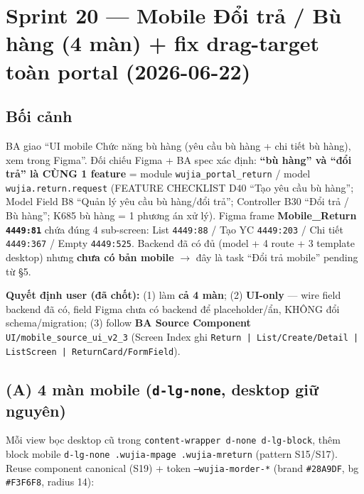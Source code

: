 \chapter{Sprint 20 --- Mobile Đổi trả / Bù hàng (4 màn) + fix drag-target toàn portal (2026-06-22)}

\section{Bối cảnh}

BA giao ``UI mobile Chức năng bù hàng (yêu cầu bù hàng + chi tiết bù hàng), xem trong
Figma''. Đối chiếu Figma + BA spec xác định: \textbf{``bù hàng'' và ``đổi trả'' là CÙNG
1 feature} = module \texttt{wujia\_portal\_return} / model \texttt{wujia.return.request}
(FEATURE CHECKLIST D40 ``Tạo yêu cầu bù hàng''; Model Field B8 ``Quản lý yêu cầu bù
hàng/đổi trả''; Controller B30 ``Đổi trả / Bù hàng''; K685 bù hàng = 1 phương án xử lý).
Figma frame \textbf{Mobile\_Return \texttt{4449:81}} chứa đúng 4 sub-screen: List
\texttt{4449:88} / Tạo YC \texttt{4449:203} / Chi tiết \texttt{4449:367} / Empty
\texttt{4449:525}. Backend đã có đủ (model + 4 route + 3 template desktop) nhưng
\textbf{chưa có bản mobile} \(\rightarrow\) đây là task ``Đổi trả mobile'' pending từ §5.

\textbf{Quyết định user (đã chốt):} (1) làm \textbf{cả 4 màn}; (2) \textbf{UI-only} --- wire
field backend đã có, field Figma chưa có backend để placeholder/ẩn, KHÔNG đổi schema/migration;
(3) follow \textbf{BA Source Component} \texttt{UI/mobile\_source\_ui\_v2\_3} (Screen Index ghi
\texttt{Return | List/Create/Detail | ListScreen | ReturnCard/FormField}).

\section{(A) 4 màn mobile (\texttt{d-lg-none}, desktop giữ nguyên)}

Mỗi view bọc desktop cũ trong \texttt{content-wrapper d-none d-lg-block}, thêm block mobile
\texttt{d-lg-none .wujia-mpage .wujia-mreturn} (pattern S15/S17). Reuse component canonical
(S19) + token \texttt{--wujia-morder-*} (brand \texttt{\#28A9DF}, bg \texttt{\#F3F6F8}, radius 14):

